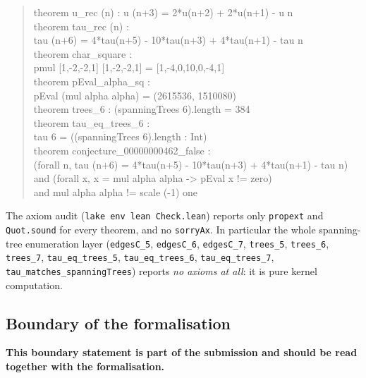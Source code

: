 \documentclass[11pt]{article}
\theoremstyle{definition}
\theoremstyle{remark}
\begin{document}
\begin{quote}\small\ttfamily
theorem u\_rec (n) : u (n+3) = 2*u(n+2) + 2*u(n+1) - u n\\
theorem tau\_rec (n) :\\
\hspace*{2em}tau (n+6) = 4*tau(n+5) - 10*tau(n+3) + 4*tau(n+1) - tau n\\
theorem char\_square :\\
\hspace*{2em}pmul [1,-2,-2,1] [1,-2,-2,1] = [1,-4,0,10,0,-4,1]\\
theorem pEval\_alpha\_sq :\\
\hspace*{2em}pEval (mul alpha alpha) = (2615536, 1510080)\\
theorem trees\_6 : (spanningTrees 6).length = 384\\
theorem tau\_eq\_trees\_6 :\\
\hspace*{2em}tau 6 = ((spanningTrees 6).length : Int)\\
theorem conjecture\_00000000462\_false :\\
\hspace*{2em}(forall n, tau (n+6) = 4*tau(n+5) - 10*tau(n+3) + 4*tau(n+1) - tau n)\\
\hspace*{2em}and (forall x, x = mul alpha alpha -> pEval x != zero)\\
\hspace*{2em}and mul alpha alpha != scale (-1) one
\end{quote}

\noindent The axiom audit (\texttt{lake env lean Check.lean}) reports only
\texttt{propext} and \texttt{Quot.sound} for every theorem, and no
\texttt{sorryAx}.  In particular the whole spanning-tree enumeration layer
(\texttt{edgesC\_5}, \texttt{edgesC\_6}, \texttt{edgesC\_7}, \texttt{trees\_5},
\texttt{trees\_6}, \texttt{trees\_7}, \texttt{tau\_eq\_trees\_5},
\texttt{tau\_eq\_trees\_6}, \texttt{tau\_eq\_trees\_7},
\texttt{tau\_matches\_spanningTrees}) reports \emph{no axioms at all}: it is
pure kernel computation.

\subsection*{Boundary of the formalisation}

\noindent\textbf{This boundary statement is part of the submission and should be
read together with the formalisation.}
\end{document}
